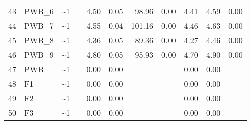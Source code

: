 \documentclass{article}
\begin{document}
\begin{table}[ht]
\begin{tabular}{rlllrrrrrrr}
  43 & PWB\_6 & \~{}1 &  & 4.50 & 0.05 & 98.96 & 0.00 & 4.41 & 4.59 & 0.00 \\ 
  44 & PWB\_7 & \~{}1 &  & 4.55 & 0.04 & 101.16 & 0.00 & 4.46 & 4.63 & 0.00 \\ 
  45 & PWB\_8 & \~{}1 &  & 4.36 & 0.05 & 89.36 & 0.00 & 4.27 & 4.46 & 0.00 \\ 
  46 & PWB\_9 & \~{}1 &  & 4.80 & 0.05 & 95.93 & 0.00 & 4.70 & 4.90 & 0.00 \\ 
  47 & PWB & \~{}1 &  & 0.00 & 0.00 &  &  & 0.00 & 0.00 &  \\ 
  48 & F1 & \~{}1 &  & 0.00 & 0.00 &  &  & 0.00 & 0.00 &  \\ 
  49 & F2 & \~{}1 &  & 0.00 & 0.00 &  &  & 0.00 & 0.00 &  \\ 
  50 & F3 & \~{}1 &  & 0.00 & 0.00 &  &  & 0.00 & 0.00 &  \\ 
   \hline
\end{tabular}
\end{table}
\end{document}
